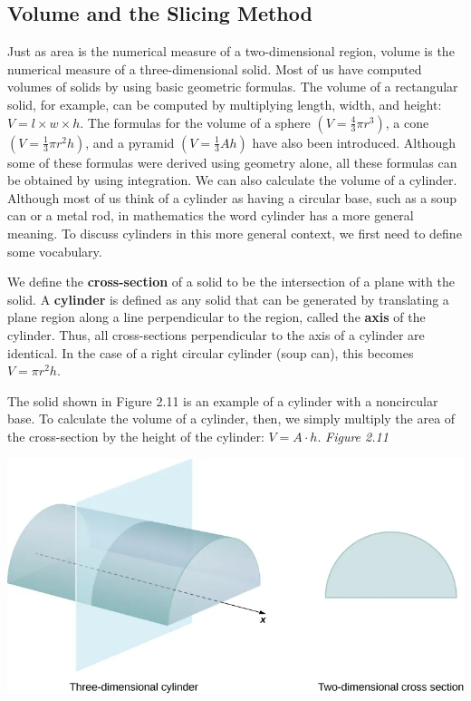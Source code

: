 \documentclass{report}
\begin{document}
    \subsection*{Volume and the Slicing Method}
    \bigbreak \noindent 
    Just as area is the numerical measure of a two-dimensional region, volume is the numerical measure of a three-dimensional solid. Most of us have computed volumes of solids by using basic geometric formulas. The volume of a rectangular solid, for example, can be computed by multiplying length, width, and height: \( V = l \times w \times h \).
    \bigbreak \noindent 
    The formulas for the volume of a sphere \(\left( V = \frac{4}{3} \pi r^3 \right)\),
    a cone \(\left( V = \frac{1}{3} \pi r^2 h \right)\),
    and a pyramid \(\left( V = \frac{1}{3} A h \right)\)
    have also been introduced. Although some of these formulas were derived using geometry alone, all these formulas can be obtained by using integration.
    \bigbreak \noindent 
    We can also calculate the volume of a cylinder. Although most of us think of a cylinder as having a circular base, such as a soup can or a metal rod, in mathematics the word cylinder has a more general meaning. To discuss cylinders in this more general context, we first need to define some vocabulary.
    \bigbreak \noindent 
    \begin{definition}
        We define the \textbf{cross-section} of a solid to be the intersection of a plane with the solid. A \textbf{cylinder} is defined as any solid that can be generated by translating a plane region along a line perpendicular to the region, called the \textbf{axis} of the cylinder. Thus, all cross-sections perpendicular to the axis of a cylinder are identical. 
        \bigbreak \noindent 
        In the case of a right circular cylinder (soup can), this becomes \( V = \pi r^2 h \).
    \end{definition}
    \bigbreak \noindent 
    The solid shown in Figure 2.11 is an example of a cylinder with a noncircular base. To calculate the volume of a cylinder, then, we simply multiply the area of the cross-section by the height of the cylinder: \( V = A \cdot h \).
    \bigbreak \noindent 
    \textit{Figure 2.11}
    \begin{center}
        \includegraphics[scale=.6]{./figures/graph8.png}
    \end{center}
\end{document}
